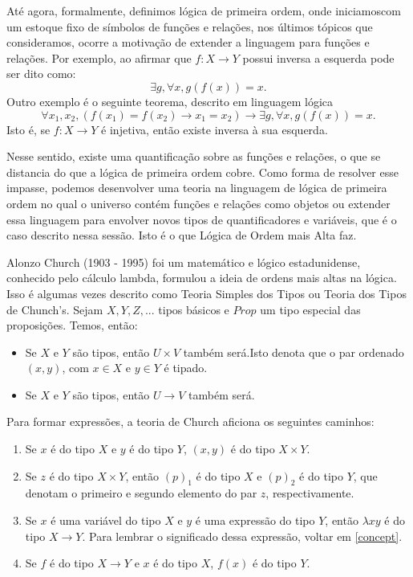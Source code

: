 Até agora, formalmente, definimos lógica de primeira ordem, onde iniciamoscom um estoque 
fixo de símbolos de funções e relações, nos últimos tópicos que  consideramos, ocorre a motivação 
de extender a linguagem para funções e relações. Por exemplo, ao afirmar que $f: X \to Y$ possui 
inversa a esquerda pode ser dito como: $$\exists g, \forall x, g(f(x)) = x.$$
Outro exemplo é o seguinte teorema, descrito em linguagem lógica 
$$\forall x_1, x_2, (f(x_1) = f(x_2) \to x_1 = x_2) \to \exists g, \forall x, g(f(x)) = x.$$
Isto é, se $f: X \to Y$ é injetiva, então existe inversa à sua esquerda.

Nesse sentido, existe uma quantificação sobre as funções e relações, o que se distancia do que a lógica 
de primeira ordem cobre. Como forma de resolver esse impasse, podemos desenvolver uma teoria na linguagem 
de lógica de primeira ordem no qual o universo contém funções e relações como objetos ou extender essa linguagem
para envolver novos tipos de quantificadores e variáveis, que é o caso descrito nessa sessão. Isto é o que Lógica
de Ordem mais Alta faz. 

Alonzo Church (1903 - 1995) foi um matemático e lógico estadunidense, conhecido pelo cálculo lambda, formulou a ideia
de ordens mais altas na lógica. Isso é algumas vezes descrito como Teoria Simples dos Tipos ou Teoria dos Tipos de 
Chunch's. Sejam $X, Y, Z,...$ tipos básicos e $Prop$ um tipo especial das proposições. Temos, então:
\begin{itemize}
    \item Se $X$ e $Y$ são tipos, então $U \times V$ também será.Isto denota que o par ordenado $(x,y)$, com $x \in X$ 
    e $y \in Y$ é tipado. 
    \item Se $X$ e $Y$ são tipos, então $U \to V$ também será.
\end{itemize}

Para formar expressões, a teoria de Church aficiona os seguintes caminhos: 
\begin{enumerate}
    \item Se $x$ é do tipo $X$ e $y$ é do tipo $Y$, $(x,y)$ é do tipo $X \times Y$. 
    \item Se $z$ é do tipo $X \times Y$, então $(p)_1$ é do tipo $X$ e $(p)_2$ é do tipo $Y$, que denotam o primeiro e 
    segundo elemento do par $z$, respectivamente. 
    \item Se $x$ é uma variável do tipo $X$ e $y$ é uma expressão do tipo $Y$, então $\lambda x y$ é do tipo $X \to Y$. 
    Para lembrar o significado dessa expressão, voltar em \ref{concept}.
    \item Se $f$ é do tipo $X \to Y$ e $x$ é do tipo $X$, $f(x)$ é do tipo $Y$. 
\end{enumerate}

